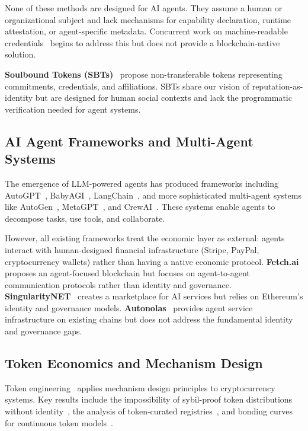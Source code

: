 \documentclass{article}
\begin{document}
None of these methods are designed for AI agents. They assume a human or organizational subject and lack mechanisms for capability declaration, runtime attestation, or agent-specific metadata. Concurrent work on machine-readable credentials~\cite{sporny2024vc} begins to address this but does not provide a blockchain-native solution.

\textbf{Soulbound Tokens (SBTs)}~\cite{weyl2022soulbound} propose non-transferable tokens representing commitments, credentials, and affiliations. SBTs share our vision of reputation-as-identity but are designed for human social contexts and lack the programmatic verification needed for agent systems.

\subsection{AI Agent Frameworks and Multi-Agent Systems}

The emergence of LLM-powered agents has produced frameworks including AutoGPT~\cite{richards2023autogpt}, BabyAGI~\cite{nakajima2023babyagi}, LangChain~\cite{langchain2023}, and more sophisticated multi-agent systems like AutoGen~\cite{wu2023autogen}, MetaGPT~\cite{hong2024metagpt}, and CrewAI~\cite{crewai2024}. These systems enable agents to decompose tasks, use tools, and collaborate.

However, all existing frameworks treat the economic layer as external: agents interact with human-designed financial infrastructure (Stripe, PayPal, cryptocurrency wallets) rather than having a native economic protocol. \textbf{Fetch.ai}~\cite{fetchai2019} proposes an agent-focused blockchain but focuses on agent-to-agent communication protocols rather than identity and governance. \textbf{SingularityNET}~\cite{singularitynet2019} creates a marketplace for AI services but relies on Ethereum's identity and governance models. \textbf{Autonolas}~\cite{autonolas2023} provides agent service infrastructure on existing chains but does not address the fundamental identity and governance gaps.

\subsection{Token Economics and Mechanism Design}

Token engineering~\cite{voshmgir2020token} applies mechanism design principles to cryptocurrency systems. Key results include the impossibility of sybil-proof token distributions without identity~\cite{douceur2002sybil}, the analysis of token-curated registries~\cite{goldin2017tcr}, and bonding curves for continuous token models~\cite{zargham2020bonding}.
\end{document}
